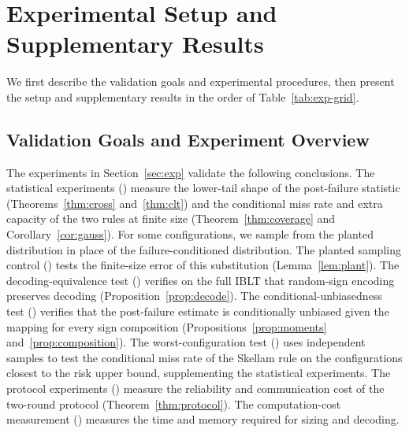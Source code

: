\section{Experimental Setup and Supplementary Results}\label{app:exp}
We first describe the validation goals and experimental procedures, then present the setup and supplementary results in the order of Table~\ref{tab:exp-grid}.

\subsection{Validation Goals and Experiment Overview}\label{app:exp-overview}
The experiments in Section~\ref{sec:exp} validate the following conclusions. The statistical experiments () measure the lower-tail shape of the post-failure statistic (Theorems~\ref{thm:cross} and~\ref{thm:clt}) and the conditional miss rate and extra capacity of the two rules at finite size (Theorem~\ref{thm:coverage} and Corollary~\ref{cor:gauss}). For some configurations, we sample from the planted distribution in place of the failure-conditioned distribution. The planted sampling control () tests the finite-size error of this substitution (Lemma~\ref{lem:plant}). The decoding-equivalence test () verifies on the full IBLT that random-sign encoding preserves decoding (Proposition~\ref{prop:decode}). The conditional-unbiasedness test () verifies that the post-failure estimate is conditionally unbiased given the mapping for every sign composition (Propositions~\ref{prop:moments} and~\ref{prop:composition}). The worst-configuration test () uses independent samples to test the conditional miss rate of the Skellam rule on the configurations closest to the risk upper bound, supplementing the statistical experiments. The protocol experiments () measure the reliability and communication cost of the two-round protocol (Theorem~\ref{thm:protocol}). The computation-cost measurement () measures the time and memory required for sizing and decoding.

